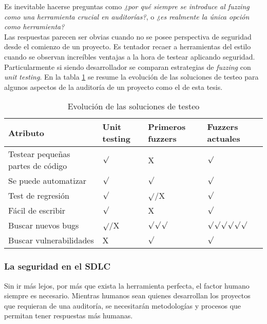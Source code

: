 Es inevitable hacerse preguntas como \textit{¿por qué siempre se introduce al fuzzing como una herramienta crucial en auditorías?}, o \textit{¿es realmente la única opción como herramienta?}\\

Las respuestas parecen ser obvias cuando no se posee perspectiva de seguridad desde el comienzo de un proyecto. Es tentador recaer a herramientas del estilo cuando se observan increíbles ventajas a la hora de testear aplicando seguridad. Particularmente si siendo desarrollador se comparan estrategias de \textit{fuzzing} con \textit{unit testing}. En la tabla \ref{tab:fuzzing} se resume la evolución de las soluciones de testeo para algunos aspectos de la auditoría de un proyecto como el de esta tesis. \\

\begin{table}
\begin{tabular}{|p{4.3cm}|p{3cm}|p{3cm}|p{3cm}|}
    \hline
    Atributo & \textbf{Unit testing} & \textbf{Primeros fuzzers} & \textbf{Fuzzers actuales} \\
    \hline
    Testear pequeñas partes de código & $\surd$ & X & $\surd$ \\
    \hline
    Se puede automatizar & $\surd$ & $\surd$ & $\surd$\\
    \hline
    Test de regresión & $\surd$ & $\surd$/X & $\surd$\\
    \hline
    Fácil de escribir & $\surd$ & X & $\surd$\\
    \hline
    Buscar nuevos bugs & $\surd$/X & $\surd$$\surd$$\surd$ & $\surd$$\surd$$\surd$$\surd$$\surd$$\surd$\\
    \hline
    Buscar vulnerabilidades & X & $\surd$ & $\surd$\\
    \hline
\end{tabular}
\caption{\label{tab:fuzzing}Evolución de las soluciones de testeo}
\end{table}

\subsubsection{La seguridad en el SDLC}
Sin ir más lejos, por más que exista la herramienta perfecta, el factor humano siempre es necesario. Mientras humanos sean quienes desarrollan los proyectos que requieran de una auditoría, se necesitarán metodologías y procesos que permitan tener respuestas más humanas.\\

